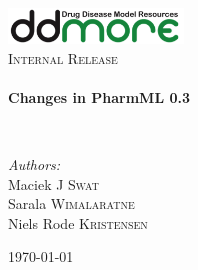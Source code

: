 \begin{titlepage}
\begin{center}

\includegraphics[width=0.35\textwidth]{./logo/ddmore_logo}~\\[1cm]

%
\textsc{\Large Internal Release}\\[0.5cm]

\HRule \\[0.4cm]
{ \huge \bfseries Changes in PharmML 0.3 \\[0.4cm] }

\HRule \\[1.5cm]

\begin{minipage}{0.4\textwidth}
\begin{flushleft} \large
\emph{Authors:}\\
Maciek J \textsc{Swat}\\
Sarala \textsc{Wimalaratne}\\
Niels Rode \textsc{Kristensen}
\end{flushleft}
\end{minipage}
\begin{minipage}{0.4\textwidth}
\end{minipage}

\vfill

{\large \today}

\end{center}
\end{titlepage}